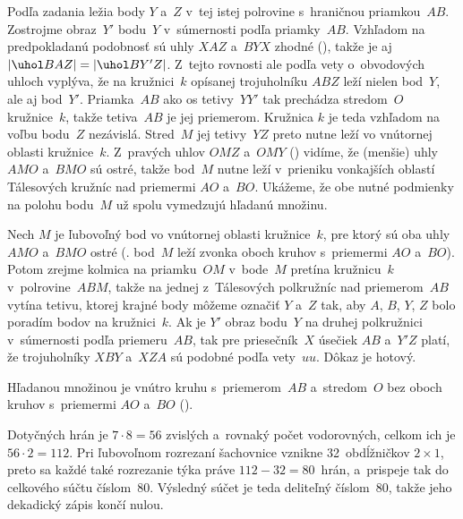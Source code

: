 {%
Podľa zadania ležia body $Y$ a~$Z$ v~tej istej polrovine s~hraničnou
priamkou~$AB$. Zostrojme obraz~$Y'$ bodu~$Y$ v~súmernosti podľa priamky~$AB$.
Vzhľadom na predpokladanú podobnosť sú uhly $XAZ$ a~$BYX$
zhodné (\obr), takže je aj $|\uhol BAZ|=|\uhol BY'Z|$.
Z~tejto rovnosti ale podľa vety o~obvodových uhloch vyplýva,
že na kružnici~$k$ opísanej trojuholníku $ABZ$ leží nielen bod~$Y$, ale aj bod~$Y'$.
Priamka~$AB$ ako os tetivy~$YY'$ tak prechádza
stredom~$O$ kružnice~$k$, takže tetiva~$AB$ je jej priemerom.
Kružnica $k$ je teda vzhľadom na voľbu bodu~$Z$ nezávislá.
Stred~$M$ jej tetivy~$YZ$ preto nutne leží vo vnútornej oblasti kružnice~$k$.
Z~pravých uhlov $OMZ$ a~$OMY$ (\obr) vidíme, že (menšie) uhly $AMO$ a~$BMO$
sú ostré, takže bod~$M$ nutne leží v~prieniku vonkajších oblastí
Tálesových kružníc nad priemermi $AO$ a~$BO$. Ukážeme, že obe nutné
podmienky na polohu bodu~$M$ už spolu vymedzujú hľadanú množinu.
%

Nech $M$ je ľubovoľný bod vo vnútornej oblasti kružnice~$k$, pre ktorý
sú oba uhly $AMO$ a~$BMO$ ostré (\tj. bod~$M$ leží zvonka oboch kruhov s~priemermi
$AO$ a~$BO$). Potom zrejme kolmica na priamku~$OM$ v~bode~$M$ pretína
kružnicu~$k$ v~polrovine~$ABM$, takže
na jednej z~Tálesových polkružníc nad priemerom~$AB$ vytína tetivu,
ktorej krajné body môžeme označiť $Y$ a~$Z$ tak, aby
$A$, $B$, $Y$, $Z$ bolo poradím bodov na kružnici~$k$. Ak je $Y'$
obraz bodu~$Y$ na druhej polkružnici v~súmernosti podľa priemeru~$AB$,
tak pre priesečník~$X$ úsečiek $AB$ a~$Y'Z$ platí, že trojuholníky $XBY$ a~$XZA$
sú podobné podľa vety~$uu$. Dôkaz je hotový.

\zaver
Hľadanou množinou je vnútro kruhu s~priemerom~$AB$ a~stredom~$O$
bez oboch kruhov s~priemermi $AO$ a~$BO$ (\obr).
%
}

{%
Dotyčných hrán je $7\cdot8=56$ zvislých a~rovnaký počet
vodorovných, celkom ich je $56\cdot2=112$.
Pri ľubovoľnom rozrezaní šachovnice vznikne 32~obdĺžničkov $2\times1$, preto
sa každé také rozrezanie týka práve $112-32=80$~hrán,
a~prispeje tak do celkového súčtu číslom~$80$. Výsledný súčet
je teda deliteľný číslom~$80$, takže jeho dekadický zápis končí nulou.
}

